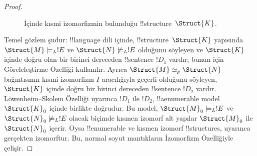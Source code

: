 \begin{proof}
\begin{figure}[h]
  \centering
  \caption{İçinde kısmi izomorfizmin bulunduğu !!{structure}~$\Struct{K}$.}
\end{figure}

Temel gözlem şudur: !!{language} dili içinde, !!{structure}~$\Struct{K}$
yapısında $\Struct{M}\models_L !E$ ve $\Struct{N}\not\models_L !E$
olduğunu söyleyen ve $\Struct{K}$ içinde doğru olan bir birinci dereceden
!!{sentence} $!D_1$ vardır; bunun için Göreleleştirme Özelliği kullanılır.
Ayrıca $\Struct{M}\simeq_p\Struct{N}$ bağıntısının kısmi izomorfizm $I$
aracılığıyla geçerli olduğunu söyleyen, $\Struct{K}$ içinde doğru bir
birinci dereceden !!{sentence} $!D_2$ vardır. L\"owenheim--Skolem Özelliği
uyarınca $!D_1$ ile $!D_2$, !!a{enumerable} model $\Struct{K}_0$ içinde
birlikte doğrudur. Bu model, $\Struct{M}_0\models_L !E$ ve
$\Struct{N}_0\not\models_L !E$ olacak biçimde kısmen izomorf alt yapılar
$\Struct{M}_0$ ile $\Struct{N}_0$ içerir. Oysa !!{enumerable} ve kısmen
izomorf !!{structure}s,  uyarınca gerçekten
izomorftur. Bu, normal soyut mantıkların İzomorfizm Özelliğiyle çelişir.
\end{proof}

